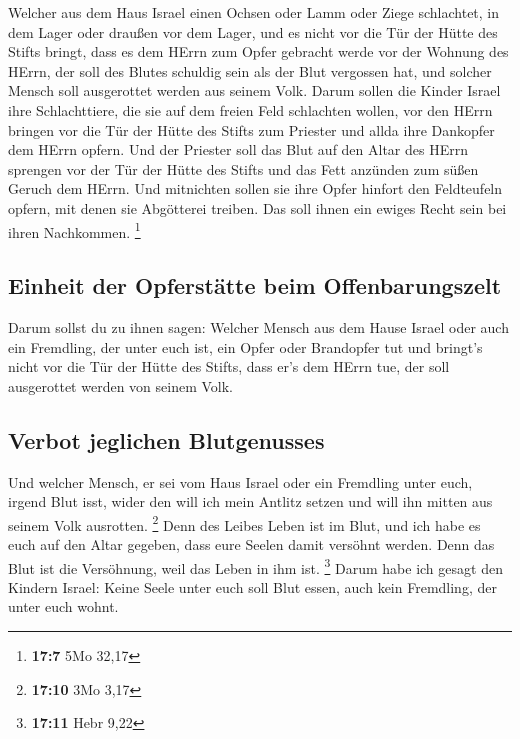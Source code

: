  Welcher aus dem Haus Israel einen Ochsen oder Lamm oder
Ziege schlachtet, in dem Lager oder draußen vor dem Lager,
 und es nicht vor die Tür der Hütte des Stifts bringt,
dass es dem HErrn zum Opfer gebracht werde vor der Wohnung des HErrn,
der soll des Blutes schuldig sein als der Blut vergossen hat, und
solcher Mensch soll ausgerottet werden aus seinem Volk. 
Darum sollen die Kinder Israel ihre Schlachttiere, die sie auf dem
freien Feld schlachten wollen, vor den HErrn bringen vor die Tür der
Hütte des Stifts zum Priester und allda ihre Dankopfer dem HErrn opfern.
 Und der Priester soll das Blut auf den Altar des HErrn
sprengen vor der Tür der Hütte des Stifts und das Fett anzünden zum
süßen Geruch dem HErrn.  Und mitnichten sollen sie ihre
Opfer hinfort den Feldteufeln opfern, mit denen sie Abgötterei treiben.
Das soll ihnen ein ewiges Recht sein bei ihren Nachkommen. \footnote{\textbf{17:7}
  5Mo 32,17}

\hypertarget{einheit-der-opferstuxe4tte-beim-offenbarungszelt}{%
\subsection{Einheit der Opferstätte beim
Offenbarungszelt}\label{einheit-der-opferstuxe4tte-beim-offenbarungszelt}}

 Darum sollst du zu ihnen sagen: Welcher Mensch aus dem
Hause Israel oder auch ein Fremdling, der unter euch ist, ein Opfer oder
Brandopfer tut  und bringt's nicht vor die Tür der Hütte
des Stifts, dass er's dem HErrn tue, der soll ausgerottet werden von
seinem Volk.

\hypertarget{verbot-jeglichen-blutgenusses}{%
\subsection{Verbot jeglichen
Blutgenusses}\label{verbot-jeglichen-blutgenusses}}

 Und welcher Mensch, er sei vom Haus Israel oder ein
Fremdling unter euch, irgend Blut isst, wider den will ich mein Antlitz
setzen und will ihn mitten aus seinem Volk ausrotten. \footnote{\textbf{17:10}
  3Mo 3,17}  Denn des Leibes Leben ist im Blut, und ich
habe es euch auf den Altar gegeben, dass eure Seelen damit versöhnt
werden. Denn das Blut ist die Versöhnung, weil das Leben in ihm ist.
\footnote{\textbf{17:11} Hebr 9,22}  Darum habe ich
gesagt den Kindern Israel: Keine Seele unter euch soll Blut essen, auch
kein Fremdling, der unter euch wohnt.

